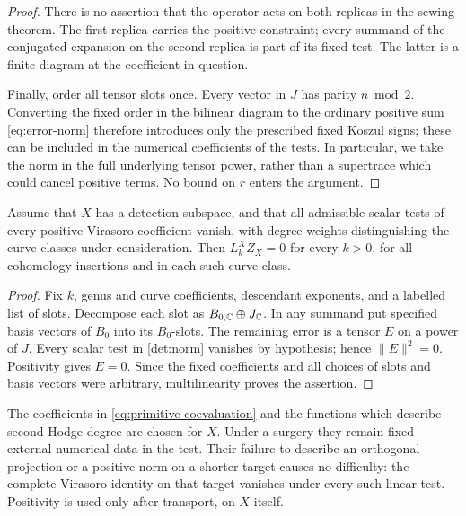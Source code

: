 \begin{proof}
There is no assertion that the operator acts on both replicas in the sewing theorem. The first replica carries the positive constraint; every summand of the conjugated expansion on the second replica is part of its fixed test. The latter is a finite diagram at the coefficient in question.

Finally, order all tensor slots once. Every vector in \(J\) has parity \(n\bmod2\). Converting the fixed order in the bilinear diagram to the ordinary positive sum \eqref{eq:error-norm} therefore introduces only the prescribed fixed Koszul signs; these can be included in the numerical coefficients of the tests. In particular, we take the norm in the full underlying tensor power, rather than a supertrace which could cancel positive terms. No bound on \(r\) enters the argument.
\end{proof}

\begin{theorem}[Detection]\label{det:detection}
Assume that \(X\) has a detection subspace, and that all admissible scalar tests of every positive Virasoro coefficient vanish, with degree weights distinguishing the curve classes under consideration. Then \(L_k^XZ_X=0\) for every \(k>0\), for all cohomology insertions and in each such curve class.
\end{theorem}

\begin{proof}
Fix \(k\), genus and curve coefficients, descendant exponents, and a labelled list of slots. Decompose each slot as \(B_{0,\mathbb C}\oplus J_\mathbb C\). In any summand put specified basis vectors of \(B_0\) into its \(B_0\)-slots. The remaining error is a tensor \(E\) on a power of \(J\). Every scalar test in \cref{det:norm} vanishes by hypothesis; hence \(\|E\|^2=0\). Positivity gives \(E=0\). Since the fixed coefficients and all choices of slots and basis vectors were arbitrary, multilinearity proves the assertion.
\end{proof}

\begin{remark}\label{det:other-targets}
The coefficients in \eqref{eq:primitive-coevaluation} and the functions which describe second Hodge degree are chosen for \(X\). Under a surgery they remain fixed external numerical data in the test. Their failure to describe an orthogonal projection or a positive norm on a shorter target causes no difficulty: the complete Virasoro identity on that target vanishes under every such linear test. Positivity is used only after transport, on \(X\) itself.
\end{remark}
